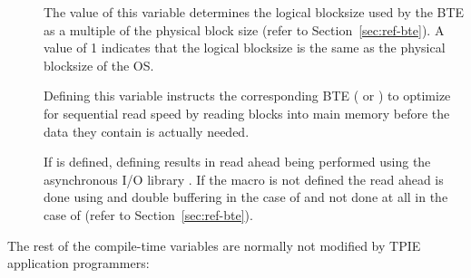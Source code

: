   \begin{description}

  \item[]
  \item[] The
  value of this variable determines the logical blocksize
  used by the BTE as a multiple of the physical block size
  (refer to Section~\ref{sec:ref-bte}). A value of 1
  indicates that the logical blocksize is the same as the
  physical blocksize of the OS.

  \item[{}] 
  \item[{}] Defining this
  variable instructs the corresponding BTE (
  or ) to optimize for sequential read speed
  by reading blocks into main memory before the data they
  contain is actually needed.
  
  \item[{}] If
   is defined, defining
   results in read ahead being performed
  using the asynchronous I/O library . If the
  macro {} is not defined the read ahead
  is done using  and double buffering in the
  case of  and not done at all in the
  case of  (refer to
  Section~\ref{sec:ref-bte}).
  \end{description}

\noindent
The rest of the compile-time variables are normally not
modified by TPIE application programmers:


